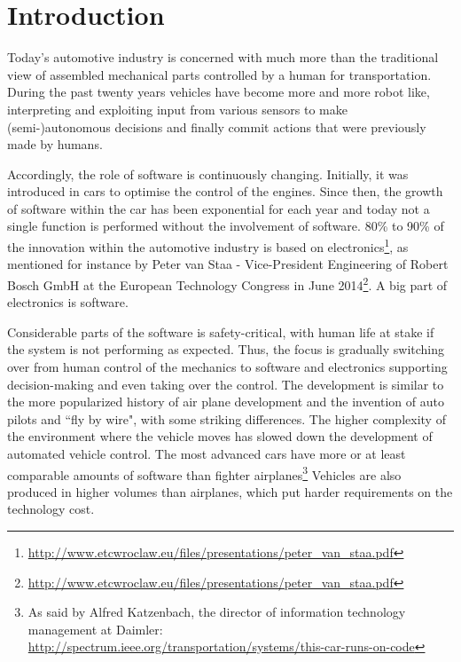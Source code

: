 \documentclass[preprint,12pt,3p]{elsarticle}
\newcommand\patrizio[1]{\nb{Patrizio}{#1}}
\newcommand\eric[1]{\nb{Eric}{#1}}
\begin{document}

\section{Introduction}
\label{sec:intro}
Today's automotive industry is concerned with much more than the traditional view of assembled
mechanical parts controlled by a human for transportation. During the past
twenty years vehicles have become more and more robot like, interpreting and
exploiting input from various sensors to make (semi-)autonomous decisions and finally commit
actions that were previously made by humans.  

Accordingly, the role of software is continuously changing. Initially, it was introduced in cars to optimise the
control of the engines. Since then, the growth of software within the car has
been exponential for each year and today not a single function is performed
without the involvement of software. 
80\% to 90\% of the innovation within the automotive industry is based on electronics\footnote{\url{http://www.etcwroclaw.eu/files/presentations/peter_van_staa.pdf}}, 
as mentioned for instance by Peter van Staa - Vice-President Engineering of Robert Bosch GmbH at the European Technology Congress in June 2014\footnote{\url{http://www.etcwroclaw.eu/files/presentations/peter_van_staa.pdf}}. 
A big part of electronics is software.

Considerable parts of the
software is safety-critical, with human life at stake if the system is not performing as
expected. Thus, the focus is gradually switching over from human control of the
mechanics to software and electronics supporting decision-making and even taking
over the control. 
The development is similar to the more popularized history of
air plane development and the invention of auto pilots and ``fly by wire", with
some striking differences. The higher complexity of the environment where the
vehicle moves has slowed down the development of automated vehicle control. The
most advanced cars have more or at least comparable amounts of software than fighter
airplanes\footnote{As said by Alfred Katzenbach, the director of information technology management at Daimler: \url{http://spectrum.ieee.org/transportation/systems/this-car-runs-on-code}}
Vehicles are also produced in higher volumes than airplanes, which put harder requirements on the technology cost.
\end{document}
